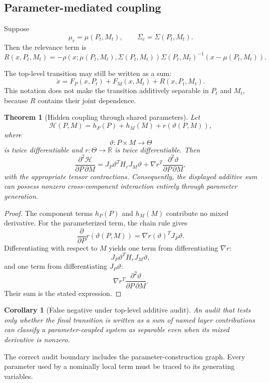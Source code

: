 \documentclass[11pt]{article}
\newtheorem{theorem}[definition]{Theorem}
\newtheorem{corollary}[definition]{Corollary}
\theoremstyle{definition}
\newcommand{\R}{\mathbb{R}}
\newcommand{\Hh}{\mathcal{H}}
\begin{document}
\subsection{Parameter-mediated coupling}

Suppose
\[
\mu_c
=
\mu(P_t,M_t),
\qquad
\Sigma_c
=
\Sigma(P_t,M_t).
\]
Then the relevance term is
\[
R(x,P_t,M_t)
=
-\rho
\left(
x;
\mu(P_t,M_t),
\Sigma(P_t,M_t)
\right)
\Sigma(P_t,M_t)^{-1}
\left(
x-\mu(P_t,M_t)
\right).
\]

The top-level transition may still be written as a sum:
\[
\dot x
=
F_P(x,P_t)
+
F_M(x,M_t)
+
R(x,P_t,M_t).
\]
This notation does not make the transition additively separable in \(P_t\) and \(M_t\), because \(R\) contains their joint dependence.

\begin{theorem}[Hidden coupling through shared parameters]
Let
\[
\Hh(P,M)
=
h_P(P)+h_M(M)+r(\vartheta(P,M)),
\]
where
\[
\vartheta:P\times M\to\Theta
\]
is twice differentiable and \(r:\Theta\to\R\) is twice differentiable. Then
\[
\frac{\partial^2\Hh}{\partial P\,\partial M}
=
J_P\vartheta^T
H_r
J_M\vartheta
+
\nabla r^T
\frac{\partial^2\vartheta}{\partial P\,\partial M},
\]
with the appropriate tensor contractions. Consequently, the displayed additive sum can possess nonzero cross-component interaction entirely through parameter generation.
\end{theorem}

\begin{proof}
The component terms \(h_P(P)\) and \(h_M(M)\) contribute no mixed derivative. For the parameterized term, the chain rule gives
\[
\frac{\partial}{\partial P}
r(\vartheta(P,M))
=
\nabla r(\vartheta)^T
J_P\vartheta.
\]
Differentiating with respect to \(M\) yields one term from differentiating \(\nabla r\):
\[
J_P\vartheta^T
H_r
J_M\vartheta,
\]
and one term from differentiating \(J_P\vartheta\):
\[
\nabla r^T
\frac{\partial^2\vartheta}
{\partial P\,\partial M}.
\]
Their sum is the stated expression.
\end{proof}

\begin{corollary}[False negative under top-level additive audit]
An audit that tests only whether the final transition is written as a sum of named layer contributions can classify a parameter-coupled system as separable even when its mixed derivative is nonzero.
\end{corollary}

The correct audit boundary includes the parameter-construction graph. Every parameter used by a nominally local term must be traced to its generating variables.
\end{document}
